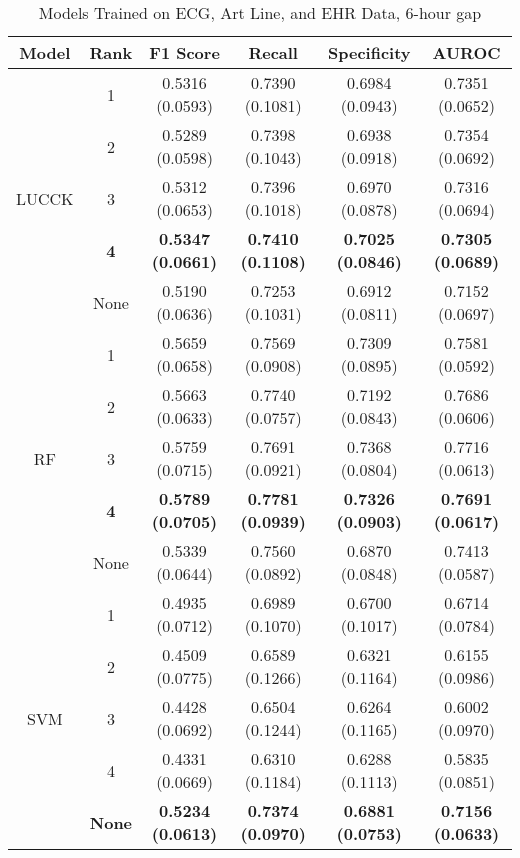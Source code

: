 \begin{table}
    \centering
    \caption{Models Trained on ECG, Art Line, and EHR Data, 6-hour gap}
    \begin{tabularx}{\textwidth}{|C|C|C|C|C|C|}
        \hline
        Model & Rank & F1 Score & Recall & Specificity & AUROC \\
        \hline
        & 1 & 0.5316 (0.0593) & 0.7390 (0.1081) & 0.6984 (0.0943) & 0.7351 (0.0652)\\
        & 2 & 0.5289 (0.0598) & 0.7398 (0.1043) & 0.6938 (0.0918) & 0.7354 (0.0692)\\
        LUCCK & 3 & 0.5312 (0.0653) & 0.7396 (0.1018) & 0.6970 (0.0878) & 0.7316 (0.0694)\\
        & \textbf{4} & \textbf{0.5347 (0.0661)} & \textbf{0.7410 (0.1108)} & \textbf{0.7025 (0.0846)} & \textbf{0.7305 (0.0689)}\\
        & None & 0.5190 (0.0636) & 0.7253 (0.1031) & 0.6912 (0.0811) & 0.7152 (0.0697)\\
        \hline
        & 1 & 0.5659 (0.0658) & 0.7569 (0.0908) & 0.7309 (0.0895) & 0.7581 (0.0592)\\
        & 2 & 0.5663 (0.0633) & 0.7740 (0.0757) & 0.7192 (0.0843) & 0.7686 (0.0606)\\
        RF & 3 & 0.5759 (0.0715) & 0.7691 (0.0921) & 0.7368 (0.0804) & 0.7716 (0.0613)\\
        & \textbf{4} & \textbf{0.5789 (0.0705)} & \textbf{0.7781 (0.0939)} & \textbf{0.7326 (0.0903)} & \textbf{0.7691 (0.0617)}\\
        & None & 0.5339 (0.0644) & 0.7560 (0.0892) & 0.6870 (0.0848) & 0.7413 (0.0587)\\
        \hline
        & 1 & 0.4935 (0.0712) & 0.6989 (0.1070) & 0.6700 (0.1017) & 0.6714 (0.0784)\\
        & 2 & 0.4509 (0.0775) & 0.6589 (0.1266) & 0.6321 (0.1164) & 0.6155 (0.0986)\\
        SVM & 3 & 0.4428 (0.0692) & 0.6504 (0.1244) & 0.6264 (0.1165) & 0.6002 (0.0970)\\
        & 4 & 0.4331 (0.0669) & 0.6310 (0.1184) & 0.6288 (0.1113) & 0.5835 (0.0851)\\
        & \textbf{None} & \textbf{0.5234 (0.0613)} & \textbf{0.7374 (0.0970)} & \textbf{0.6881 (0.0753)} & \textbf{0.7156 (0.0633)}\\
        \hline
    \end{tabularx}
\end{table}

